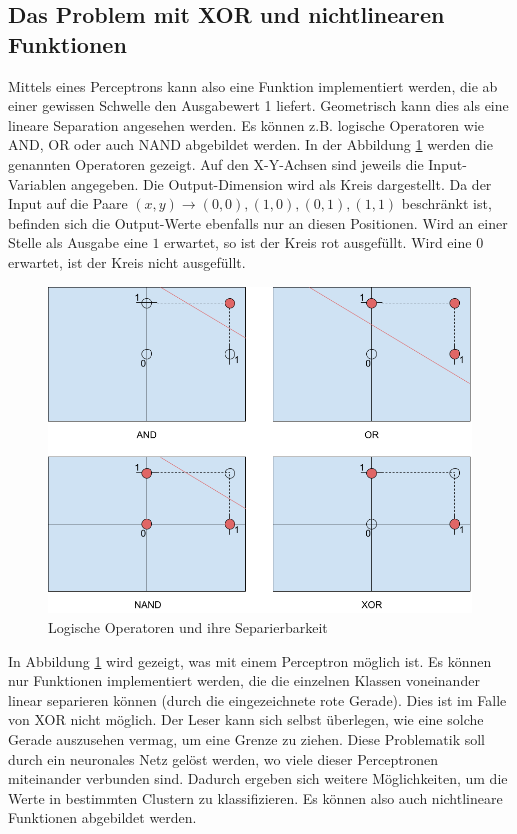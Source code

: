 \subsection{Das Problem mit XOR und nichtlinearen Funktionen}\label{chapter:02_xor_perceptron}
Mittels eines Perceptrons kann also eine Funktion implementiert werden, die ab einer gewissen Schwelle den
Ausgabewert 1 liefert. Geometrisch kann dies als eine lineare Separation angesehen werden. Es können z.B. logische
Operatoren wie \glqq AND\grqq{}, \glqq OR\grqq{} oder auch \glqq NAND\grqq{} abgebildet werden.
In der Abbildung \ref{fig:06_logische_operatoren_1} werden die genannten Operatoren gezeigt. Auf den X-Y-Achsen
sind jeweils die Input-Variablen angegeben. Die Output-Dimension wird als Kreis dargestellt. Da der Input auf die Paare
$(x,y) \longrightarrow (0,0), (1,0), (0,1), (1,1)$ beschränkt ist, befinden sich die Output-Werte ebenfalls nur an diesen
Positionen. Wird an einer Stelle als Ausgabe eine $1$ erwartet, so ist der Kreis rot ausgefüllt. Wird eine $0$ erwartet,
ist der Kreis nicht ausgefüllt.
\begin{figure}[h!]
    \begin{center}
        \includegraphics[width=0.6\linewidth]{../common/01_neuronal_network/00_resources/01_logische_operatoren.png}
    \end{center}
    \caption{Logische Operatoren und ihre Separierbarkeit}
    \label{fig:06_logische_operatoren_1}
\end{figure}
In Abbildung \ref{fig:06_logische_operatoren_1} wird gezeigt, was mit einem Perceptron möglich ist. Es können nur
Funktionen implementiert werden, die die einzelnen Klassen voneinander linear separieren können (durch die eingezeichnete
rote Gerade). Dies ist im Falle von \glqq XOR\grqq{} nicht möglich. Der Leser kann sich selbst überlegen, wie eine solche
Gerade auszusehen vermag, um eine Grenze zu ziehen. Diese Problematik soll durch ein neuronales Netz gelöst werden, wo
viele dieser Perceptronen miteinander verbunden sind. Dadurch ergeben sich weitere Möglichkeiten, um die Werte in
bestimmten Clustern zu klassifizieren. Es können also auch nichtlineare Funktionen abgebildet werden.
